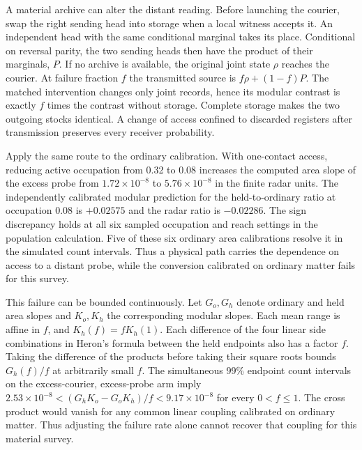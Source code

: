\documentclass[11pt]{article}
\begin{document}
A material archive can alter the distant reading. Before launching the
courier, swap the right sending head into storage when a local witness
accepts it. An independent head with the same conditional marginal takes
its place. Conditional on reversal parity, the two sending heads then have
the product of their marginals, $P$. If no archive is available, the
original joint state $\rho$ reaches the courier. At failure fraction $f$
the transmitted source is $f\rho+(1-f)P$. The matched intervention
changes only joint records, hence its modular contrast is exactly $f$
times the contrast without storage. Complete storage makes the two
outgoing stocks identical. A change of access confined to discarded
registers after transmission preserves every receiver probability.

Apply the same route to the ordinary calibration. With one-contact
access, reducing active occupation from 0.32 to 0.08 increases the
computed area slope of the excess probe from $1.72\times10^{-8}$ to
$5.76\times10^{-8}$ in the finite radar units. The independently
calibrated modular prediction for the held-to-ordinary ratio at
occupation 0.08 is $+0.02575$ and the radar ratio is $-0.02286$.
The sign discrepancy holds at all six sampled occupation and reach
settings in the population calculation. Five of these six ordinary
area calibrations resolve it in the simulated count intervals. Thus
a physical path carries the dependence on access to a distant probe,
while the conversion calibrated on ordinary matter fails for this survey.

This failure can be bounded continuously. Let $G_o,G_h$ denote
ordinary and held area slopes and $K_o,K_h$ the corresponding modular
slopes. Each mean range is affine in $f$, and $K_h(f)=fK_h(1)$.
Each difference of the four linear side combinations in Heron's formula
between the held endpoints also has a factor $f$. Taking the difference
of the products before taking their square roots bounds $G_h(f)/f$
at arbitrarily small $f$. The simultaneous 99\% endpoint count intervals
on the excess-courier, excess-probe arm imply
$2.53\times10^{-8}<(G_h K_o-G_o K_h)/f<9.17\times10^{-8}$
for every $0<f\le 1$. The cross product would vanish for any common
linear coupling calibrated on ordinary matter. Thus adjusting the
failure rate alone cannot recover that coupling for this material survey.
\end{document}
